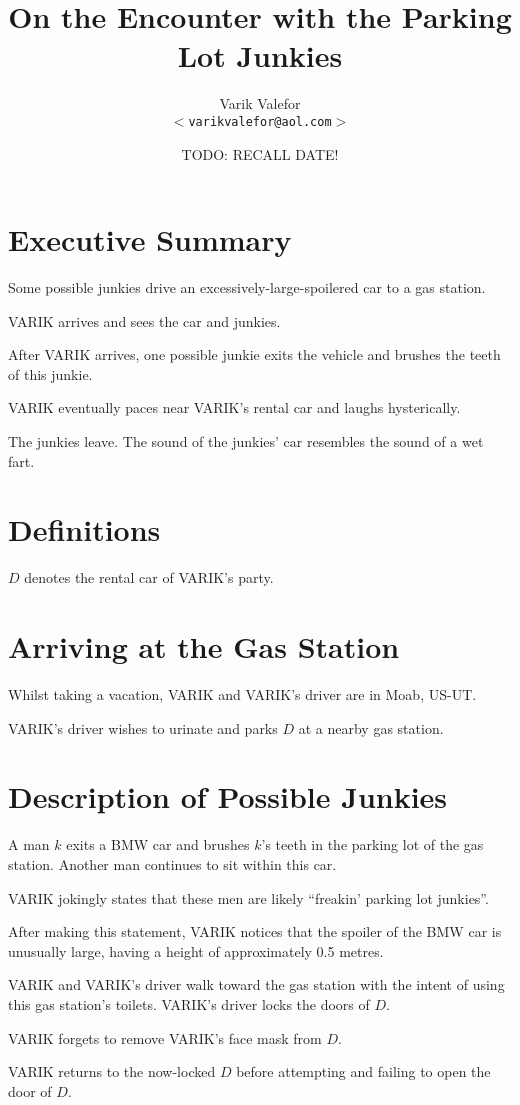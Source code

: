 \documentclass{article}
\title{On the Encounter with the Parking Lot Junkies}
\author{Varik Valefor\\{\small \texttt{$<$varikvalefor@aol.com$>$}}}
\date{TODO\@: RECALL DATE!}
\begin{document}
	\maketitle
	\section{Executive Summary}
		Some possible junkies drive an excessively-large-spoilered car to
		a gas station.

		VARIK arrives and sees the car and junkies.

		After VARIK arrives, one possible junkie exits the vehicle and
		brushes the teeth of this junkie.

		VARIK eventually paces near VARIK's rental car and laughs
		hysterically.

		The junkies leave.  The sound of the junkies' car
		resembles the sound of a wet fart.
	\section{Definitions}
		$D$ denotes the rental car of VARIK's party.
	\section{Arriving at the Gas Station}
		Whilst taking a vacation, VARIK and VARIK's driver are in Moab,
		US-UT\@.

		VARIK's driver wishes to urinate and parks $D$ at a nearby gas
		station.
	\section{Description of Possible Junkies}
		A man $k$ exits a BMW car and brushes $k$'s teeth
		in the parking lot of the gas station.  Another man continues to sit
		within this car.

		VARIK jokingly states that these men are likely ``freakin' parking
		lot junkies''.

		After making this statement, VARIK notices that the spoiler of the
		BMW car is unusually large, having a height of approximately 0.5
		metres.

		VARIK and VARIK's driver walk toward the gas station with the intent
		of using this gas station's toilets.  VARIK's driver locks the doors
		of $D$.

		VARIK forgets to remove VARIK's face mask from $D$.

		VARIK returns to the now-locked $D$ before attempting and failing
		to open the door of $D$.
\end{document}
